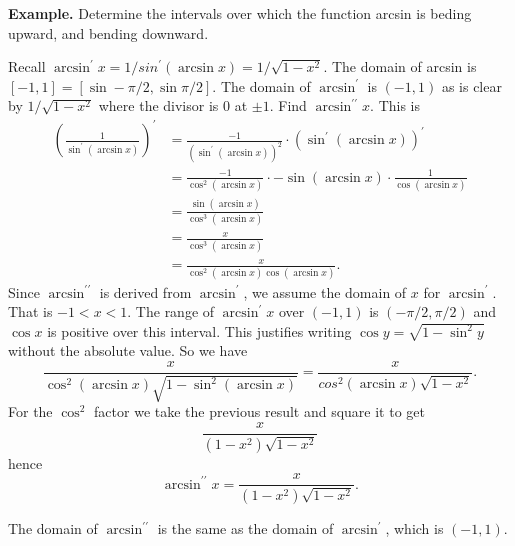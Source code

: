           \textbf{Example.} Determine the intervals over which the function arcsin is beding upward, and bending downward.

          Recall $\arcsin^\prime x = 1/sin^\prime(\arcsin x) = 1/\sqrt{1 - x^2}$. The domain of arcsin is $[-1, 1] = [\sin -\pi/2, \sin \pi/2]$. The domain of $\arcsin^\prime$ is $(-1, 1)$ as is clear by $1/\sqrt{1 - x^2}$ where the divisor is $0$ at $\pm 1$.
          Find $\arcsin^{\prime\prime} x$. This is
          \begin{align*}
            (\frac{1}{\sin^\prime(\arcsin x)})^\prime &= \frac{-1}{(\sin^\prime(\arcsin x))^2} \cdot (\sin^\prime(\arcsin x))^\prime\\
            &= \frac{-1}{\cos^2(\arcsin x)} \cdot -\sin(\arcsin x) \cdot \frac{1}{\cos(\arcsin x)}\\
            &= \frac{\sin(\arcsin x)}{\cos^3(\arcsin x)}\\
            &= \frac{x}{\cos^3(\arcsin x)}\\
            &= \frac{x}{\cos^2(\arcsin x)\cos(\arcsin x)}.
          \end{align*}
          Since $\arcsin^{\prime\prime}$ is derived from $\arcsin^\prime$, we assume the domain of $x$ for $\arcsin^\prime$. That is $-1 < x < 1$. The range of $\arcsin^\prime x$ over $(-1, 1)$ is $(-\pi/2, \pi/2)$ and $\cos x$ is positive over this interval. This justifies writing $\cos y = \sqrt{1 - \sin^2 y}$ without the absolute value. So we have
          \[\frac{x}{\cos^2(\arcsin x)\sqrt{1 - \sin^2(\arcsin x)}} = \frac{x}{cos^2(\arcsin x)\sqrt{1 - x^2}}.\]
          For the $\cos^2$ factor we take the previous result and square it to get
          \[\frac{x}{(1 - x^2)\sqrt{1 - x^2}}\]
          hence
          \[\arcsin^{\prime\prime} x = \frac{x}{(1 - x^2)\sqrt{1 - x^2}}.\]
          
          The domain of $\arcsin^{\prime\prime}$ is the same as the domain of $\arcsin^\prime$, which is $(-1, 1)$.
